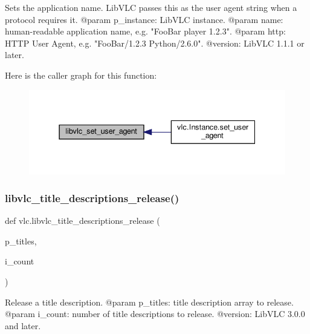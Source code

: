 \begin{DoxyVerb}Sets the application name. LibVLC passes this as the user agent string
when a protocol requires it.
@param p_instance: LibVLC instance.
@param name: human-readable application name, e.g. "FooBar player 1.2.3".
@param http: HTTP User Agent, e.g. "FooBar/1.2.3 Python/2.6.0".
@version: LibVLC 1.1.1 or later.
\end{DoxyVerb}
 Here is the caller graph for this function\+:
\nopagebreak
\begin{figure}[H]
\begin{center}
\leavevmode
\includegraphics[width=337pt]{namespacevlc_ac417c29edf981dc1f14649d41624e2b5_icgraph}
\end{center}
\end{figure}
\mbox{\label{namespacevlc_a39ff76a9d36a5266dfcb66c078455da8}} 
\subsubsection{\texorpdfstring{libvlc\+\_\+title\+\_\+descriptions\+\_\+release()}{libvlc\_title\_descriptions\_release()}}
{\footnotesize\ttfamily def vlc.\+libvlc\+\_\+title\+\_\+descriptions\+\_\+release (\begin{DoxyParamCaption}\item[{}]{p\+\_\+titles,  }\item[{}]{i\+\_\+count }\end{DoxyParamCaption})}

\begin{DoxyVerb}Release a title description.
@param p_titles: title description array to release.
@param i_count: number of title descriptions to release.
@version: LibVLC 3.0.0 and later.
\end{DoxyVerb}
 \mbox{\label{namespacevlc_a370780527977cf3a710b9c542f88b0aa}} 

